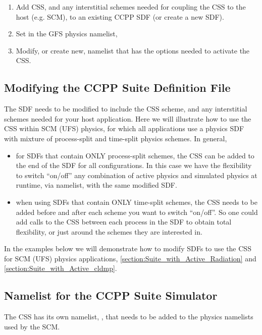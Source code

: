 \begin{enumerate}
\item Add CSS, and any interstitial schemes needed for coupling the CSS to the host (e.g. SCM), to an existing CCPP SDF (or create a new SDF).
\item Set  in the GFS physics namelist, 
\item Modify, or create new, namelist that has the options needed to activate the CSS.
\end{enumerate}

\subsection{Modifying the CCPP Suite Definition File}

The SDF needs to be modified to include the CSS scheme, and any interstitial schemes needed for your host application. Here we will illustrate how to use the CSS within SCM (UFS) physics, for which all applications use a physics SDF with mixture of process-split and time-split physics schemes.
In general,
\begin{itemize}
\item for SDFs that contain ONLY process-split schemes, the CSS can be added to the end of the SDF for all configurations. In this case we have the flexibility to switch ``on/off'' any combination of active physics and simulated physics at runtime, via namelist, with the same modified SDF.
\item when using SDFs that contain ONLY time-split schemes, the CSS needs to be added before and after each scheme you want to switch ``on/off''. So one could add calls to the CSS between each process in the SDF to obtain total flexibility, or just around the schemes they are interested in.
\end{itemize}

In the examples below we will demonstrate how to modify SDFs to use the CSS for SCM (UFS) physics applications, \ref{section:Suite_with_Active_Radiation} and \ref{section:Suite_with_Active_cldmp}.

\subsection{Namelist for the CCPP Suite Simulator}

The CSS has its own namelist, , that needs to be added to the physics namelists used by the SCM.

